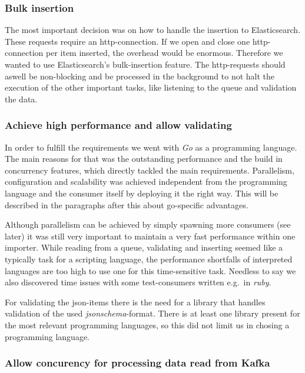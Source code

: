 \subsubsection{Bulk insertion}\label{bulk-insertion}

The most important decision was on how to handle the insertion to
Elasticsearch. These requests require an http-connection. If we open and
close one http-connection per item inserted, the overhead would be
enormous. Therefore we wanted to use Elasticsearch's bulk-insertion
feature. The http-requests should aswell be non-blocking and be
processed in the background to not halt the execution of the other
important tasks, like listening to the queue and validation the data.

\subsubsection{Achieve high performance and allow
validating}\label{achieve-high-performance-and-allow-validating}

In order to fulfill the requirements we went with \emph{Go} as a
programming language. The main reasons for that was the outstanding
performance and the build in concurrency features, which directly
tackled the main requirements. Parallelism, configuration and
scalability was achieved independent from the programming language and
the consumer itself by deploying it the right way. This will be
described in the paragraphs after this about go-specific advantages.

Although parallelism can be achieved by simply spawning more consumers
(see later) it was still very important to maintain a very fast
performance within one importer. While reading from a queue, validating
and inserting seemed like a typically task for a scripting language, the
performance shortfalls of interpreted languages are too high to use one
for this time-sensitive task. Needless to say we also discovered time
issues with some test-consumers written e.g.~in \emph{ruby}.

For validating the json-items there is the need for a library that
handles validation of the used \emph{jsonschema}-format. There is at
least one library present for the most relevant programming languages,
so this did not limit us in chosing a programming language.

\subsubsection{Allow concurency for processing data read from
Kafka}\label{allow-concurency-for-processing-data-read-from-kafka-1}

